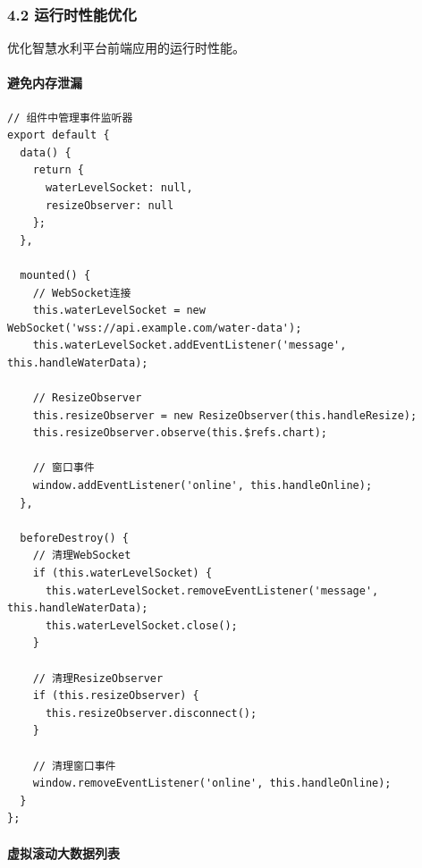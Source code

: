 \subsubsection{4.2
运行时性能优化}\label{ux8fd0ux884cux65f6ux6027ux80fdux4f18ux5316}

优化智慧水利平台前端应用的运行时性能。

\paragraph{避免内存泄漏}\label{ux907fux514dux5185ux5b58ux6cc4ux6f0f}

\begin{lstlisting}
// 组件中管理事件监听器
export default {
  data() {
    return {
      waterLevelSocket: null,
      resizeObserver: null
    };
  },
  
  mounted() {
    // WebSocket连接
    this.waterLevelSocket = new WebSocket('wss://api.example.com/water-data');
    this.waterLevelSocket.addEventListener('message', this.handleWaterData);
    
    // ResizeObserver
    this.resizeObserver = new ResizeObserver(this.handleResize);
    this.resizeObserver.observe(this.$refs.chart);
    
    // 窗口事件
    window.addEventListener('online', this.handleOnline);
  },
  
  beforeDestroy() {
    // 清理WebSocket
    if (this.waterLevelSocket) {
      this.waterLevelSocket.removeEventListener('message', this.handleWaterData);
      this.waterLevelSocket.close();
    }
    
    // 清理ResizeObserver
    if (this.resizeObserver) {
      this.resizeObserver.disconnect();
    }
    
    // 清理窗口事件
    window.removeEventListener('online', this.handleOnline);
  }
};
\end{lstlisting}

\paragraph{虚拟滚动大数据列表}\label{ux865aux62dfux6edaux52a8ux5927ux6570ux636eux5217ux8868}


